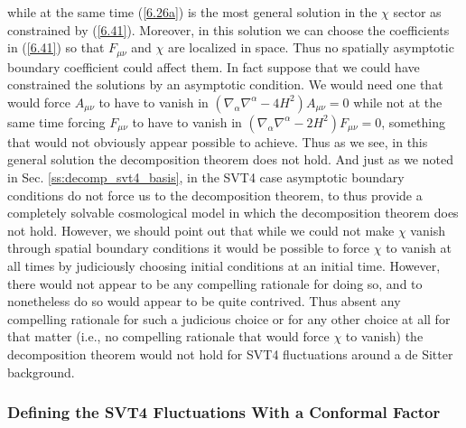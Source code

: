 while at the same time (\ref{6.26a}) is the most general solution in the $\chi$ sector as constrained by (\ref{6.41}). Moreover, in this solution we can choose the coefficients in (\ref{6.41}) so that $F_{\mu\nu}$ and $\chi$ are localized in space. Thus no spatially asymptotic boundary coefficient could affect them. In fact suppose that we could have constrained the solutions by an asymptotic condition. We would need one that would force $A_{\mu\nu}$ to have to vanish in $(\nabla_{\alpha}\nabla^{\alpha}-4H^2)A_{\mu\nu}=0$ while not at the same time forcing $F_{\mu\nu}$ to have to vanish in $(\nabla_{\alpha}\nabla^{\alpha}-2H^2)F_{\mu\nu}=0$, something that would not obviously appear possible to achieve. Thus as we see, in this general solution the decomposition theorem does not hold. And just as we noted in Sec. \ref{ss:decomp_svt4_basis}, in the SVT4 case asymptotic boundary conditions do not force us to the decomposition theorem, to thus provide a completely solvable cosmological model in which the decomposition theorem does not hold. However, we should point out that while we could not make $\chi$ vanish through spatial boundary conditions it would be possible to force $\chi$ to vanish at all times by judiciously choosing initial  conditions at an initial time.  However, there would not appear to be any compelling rationale for doing so, and  to nonetheless do so would appear to be quite contrived. Thus absent any compelling rationale for such a judicious choice or for any other choice at all for that matter (i.e., no compelling rationale that would force $\chi$ to vanish) the decomposition theorem would not hold for SVT4 fluctuations around a de Sitter background.


\subsubsection{Defining the SVT4 Fluctuations With a Conformal Factor}
\label{sss:defining_svt4_without_conformal_factor}

